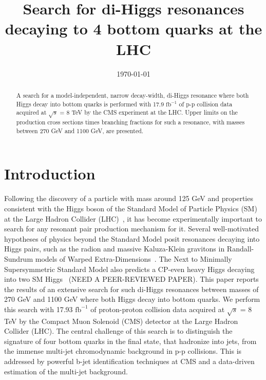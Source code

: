 \documentclass[aps,prd,reprint,superscriptaddress,nofootinbib,showpacs,floatfix]{revtex4-1}
\def\fbinv{\textrm{fb}^{-1}}
\begin{document}
\title{\boldmath 
Search for di-Higgs resonances decaying to 4 bottom quarks at the LHC
}


\noaffiliation
\date{\today}

\begin{abstract}
A search for a model-independent, narrow decay-width, di-Higgs resonance where both Higgs decay into bottom quarks is performed with 17.9 $\fbinv$ of p-p collision data acquired at $\sqrt{s}$ = 8 TeV by the CMS experiment at the LHC. Upper limits on the production cross sections times branching fractions for such a resonance, with masses between 270 GeV and 1100 GeV, are presented.
\end{abstract}


\maketitle

\section{Introduction}

Following the discovery of a particle with mass around 125 GeV and properties consistent with the Higgs boson of the Standard Model of Particle Physics (SM) at the Large Hadron Collider (LHC)~\cite{Chatrchyan201230, Aad20121}, it has become experimentally important to search for any resonant pair production mechanism for it. Several well-motivated hypotheses of physics beyond the Standard Model posit resonances decaying into Higgs pairs, such as the radion and massive Kaluza-Klein gravitons in Randall-Sundrum models of Warped Extra-Dimensions~\cite{radion}. The Next to Minimally Supersymmetric Standard Model also predicts a CP-even heavy Higgs decaying into two SM Higgs~\cite{sns} (NEED A PEER-REVIEWED PAPER). This paper reports the results of an extensive search for such di-Higgs resonances between masses of 270 GeV and 1100 GeV where both Higgs decay into bottom quarks. We perform this search with 17.93 $\fbinv$ of proton-proton collision data acquired at $\sqrt{s}$ = 8 TeV by the Compact Muon Solenoid (CMS) detector at the Large Hadron Collider (LHC). The central challenge of this search is to distinguish the signature of four bottom quarks in the final state, that hadronize into jets, from the immense multi-jet chromodynamic background in p-p collisions. This is addressed by powerful b-jet identification techniques at CMS and a data-driven estimation of the multi-jet background.
\end{document}
